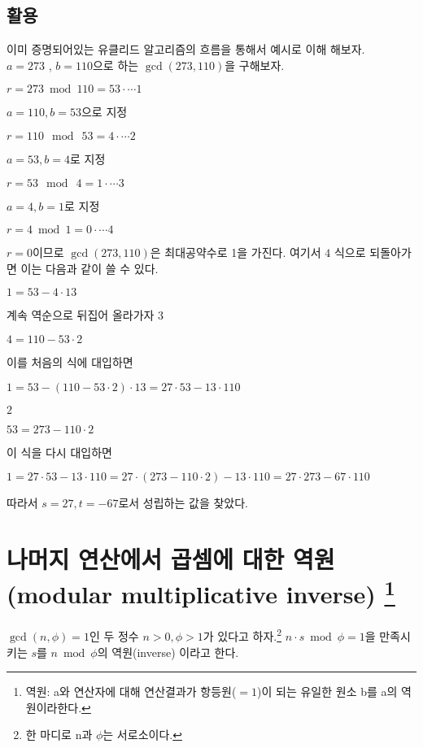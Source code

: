 \subsection{활용}
이미 증명되어있는 유클리드 알고리즘의 흐름을 통해서 예시로 이해 해보자.\\
$a=273$  , $b=110$으로 하는 $\gcd(273,110)$을 구해보자.
\begin{center}
    $r= 273\bmod  110 = 53 \cdot\cdots \mathit{1}$
\end{center}
$a=110 , b=53$으로 지정
\begin{center}
    $r= 110\:\bmod \: 53 = 4\cdot\cdots \mathit{2}$
\end{center}
$a=53 , b=4$로 지정
\begin{center}
    $r= 53\:\bmod \: 4 = 1 \cdot\cdots \mathit{3}$
\end{center}
$a=4 , b=1$로 지정
\begin{center}
    $r= 4\bmod  1 = 0\cdot\cdots \mathit{4}$
\end{center}
$r=0$이므로 $\gcd(273,110)$은 최대공약수로 1을 가진다.
여기서 $\mathit{4}$ 식으로 되돌아가면 이는 다음과 같이 쓸 수 있다.
\begin{center}
    $1=53 - 4\cdot13$
\end{center}
계속 역순으로 뒤집어 올라가자 $\mathit{3}$
\begin{center}
    $4=110 - 53\cdot2$
\end{center}
이를 처음의 식에 대입하면
\begin{center}
    $1=53 - (110 - 53\cdot2)\cdot13 =27\cdot53-13\cdot110 $
\end{center}
$\mathit{2}$
\begin{center}
    $53=273 - 110\cdot2$
\end{center}
이 식을 다시 대입하면
\begin{center}
    $1=27\cdot53-13\cdot110=27\cdot(273 - 110\cdot2)-13\cdot110=27\cdot273-67\cdot 110$
\end{center}
따라서 $s=27, t=-67$로서 성립하는 값을 찾았다.




\section{나머지 연산에서 곱셈에 대한 역원 (modular multiplicative inverse)
\protect\footnote{역원: a와 연산자에 대해 연산결과가 항등원($=1$)이 되는 유일한 원소 b를 a의 역원이라한다.}} 

\begin{dfn}[Inverse]
    $\gcd(n,\phi)=1$인 두 정수 $n>0, \phi>1$가 있다고 하자.\footnote{한 마디로 n과 $\phi$는 서로소이다.}
$n\cdot s\bmod  \phi =1 $을 만족시키는 $s$를 $n\bmod  \phi$의 역원(inverse) 이라고 한다.\par
\end{dfn}

